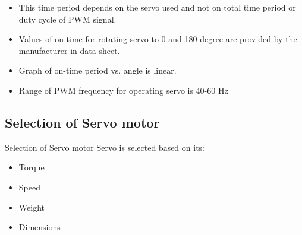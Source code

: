 \documentclass[table,10pt,red]{beamer}	%
\begin{document}
\begin{frame}
	\begin{itemize}
		\item
		This time period depends on the servo used and not on total time period or duty cycle of PWM signal.\\
		
		
		\pause
		\item
		Values of on-time for rotating servo to 0 and 180 degree are provided by the manufacturer in data sheet.\\ 
		
		
		\pause
		\item
		Graph of on-time period vs. angle is linear.
		
		
		\pause
		\item
		Range of PWM frequency for operating servo is 40-60 Hz
	\end{itemize}
\end{frame}

\subsection{Selection of Servo motor}
\begin{frame}{Selection of Servo motor}
	Servo is selected based on its:
	\begin{itemize}
		
		
		\pause
		\item
		Torque
		\pause
		\item		
		Speed
		\pause
		\item
		Weight
		\pause
		\item
		Dimensions
		
		
	\end{itemize}
\end{frame}
\end{document}

